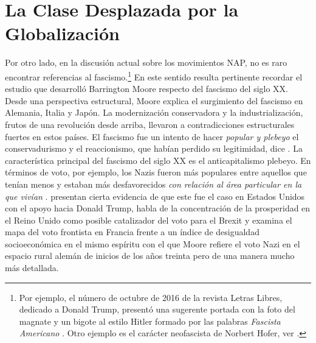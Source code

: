 \section{La Clase Desplazada por la Globalización}

Por otro lado, en la discusión actual sobre los movimientos NAP, no es raro encontrar referencias al fascismo.\footnote{Por ejemplo, el número de octubre de 2016 de la revista Letras Libres, dedicado a Donald Trump, presentó una sugerente portada con la foto del magnate y un bigote al estilo Hitler formado por las palabras \textit{Fascista Americano} \parencite{Fascista16}. Otro ejemplo es el carácter neofascista de Norbert Hofer, ver \textcite{Hoare16}.} En este sentido resulta pertinente recordar el estudio que desarrolló Barrington Moore respecto del fascismo del siglo XX.\\ 

Desde una perspectiva estructural, Moore explica el surgimiento del fascismo en Alemania, Italia y Japón. La modernización conservadora y la industrialización, frutos de una revolución desde arriba, llevaron a contradicciones estructurales fuertes en estos países. El fascismo fue un intento de hacer \textit{popular y plebeyo} el conservadurismo y el reaccionismo, que habían perdido su legitimidad, dice \textcite[447]{Moore66}. La característica principal del fascismo del siglo XX es el anticapitalismo plebeyo. En términos de voto, por ejemplo, los Nazis fueron más populares entre aquellos que tenían menos y estaban más desfavorecidos \textit{con relación al área particular en la que vivían} \parencite[448-449]{Moore66}. \textcite{Sides16} presentan cierta evidencia de que este fue el caso en Estados Unidos con el apoyo hacia Donald Trump, \textcite{Arnade16} habla de la concentración de la prosperidad en el Reino Unido como posible catalizador del voto para el Brexit y \textcite{LeBras15} examina el mapa del voto frontista en Francia frente a un índice de desigualdad socioeconómica en el mismo espíritu con el que Moore refiere el voto Nazi en el espacio rural alemán de inicios de los años treinta pero de una manera mucho más detallada.\\

